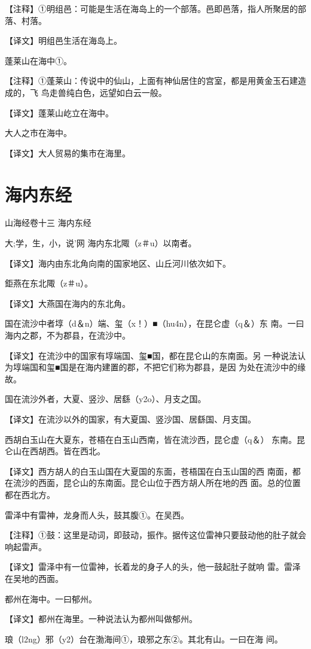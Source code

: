 \documentclass[a4paper,12pt,UTF8,twoside]{ctexbook}
\begin{document}
【注释】①明组邑：可能是生活在海岛上的一个部落。邑即邑落，指人所聚居的部落、村落。

【译文】明组邑生活在海岛上。

蓬莱山在海中①。

【注释】①蓬莱山：传说中的仙山，上面有神仙居住的宫室，都是用黄金玉石建造成的，飞 鸟走兽纯白色，远望如白云一般。

【译文】蓬莱山屹立在海中。

大人之市在海中。

【译文】大人贸易的集市在海里。

\chapter{海内东经}

山海经卷十三 海内东经

大;学，生，小，说'网
海内东北陬（z＃u）以南者。

【译文】海内由东北角向南的国家地区、山丘河川依次如下。

鉅燕在东北陬（z＃u）。

【译文】大燕国在海内的东北角。

国在流沙中者埻（d＆n）端、玺（x！）■（hu4n），在昆仑虚（q＆）东 南。一曰海内之郡，不为郡县，在流沙中。

【译文】在流沙中的国家有埻端国、玺■国，都在昆仑山的东南面。另 一种说法认为埻端国和玺■国是在海内建置的郡，不把它们称为郡县，是因 为处在流沙中的缘故。

国在流沙外者，大夏、竖沙、居繇（y2o）、月支之国。

【译文】在流沙以外的国家，有大夏国、竖沙国、居繇国、月支国。

西胡白玉山在大夏东，苍梧在白玉山西南，皆在流沙西，昆仑虚（q＆） 东南。昆仑山在西胡西。皆在西北。

【译文】西方胡人的白玉山国在大夏国的东面，苍梧国在白玉山国的西 南面，都在流沙的西面，昆仑山的东南面。昆仑山位于西方胡人所在地的西 面。总的位置都在西北方。

雷泽中有雷神，龙身而人头，鼓其腹①。在吴西。

【注释】①鼓：这里是动词，即鼓动，振作。据传这位雷神只要鼓动他的肚子就会响起雷声。

【译文】雷泽中有一位雷神，长着龙的身子人的头，他一鼓起肚子就响 雷。雷泽在吴地的西面。

都州在海中。一曰郁州。

【译文】都州在海里。一种说法认为都州叫做郁州。

琅（l2ng）邪（y2）台在渤海间①，琅邪之东②。其北有山。一曰在海 间。
\end{document}
